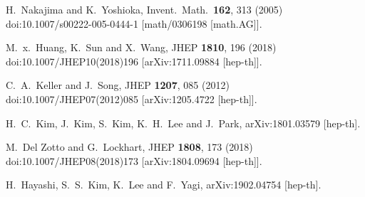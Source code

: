 \documentclass[12pt]{article}
\begin{document}
\pagebreak
\providecommand{\href}[2]{#2}\begingroup\raggedright\begin{thebibliography}{10}

  H.~Nakajima and K.~Yoshioka,
  Invent.\ Math.\  {\bf 162}, 313 (2005)
  doi:10.1007/s00222-005-0444-1
  [math/0306198 [math.AG]].

  M.~x.~Huang, K.~Sun and X.~Wang,
  JHEP {\bf 1810}, 196 (2018)
  doi:10.1007/JHEP10(2018)196
  [arXiv:1711.09884 [hep-th]].

  C.~A.~Keller and J.~Song,
  JHEP {\bf 1207}, 085 (2012)
  doi:10.1007/JHEP07(2012)085
  [arXiv:1205.4722 [hep-th]].

  H.~C.~Kim, J.~Kim, S.~Kim, K.~H.~Lee and J.~Park,
  arXiv:1801.03579 [hep-th].

  M.~Del Zotto and G.~Lockhart,
  JHEP {\bf 1808}, 173 (2018)
  doi:10.1007/JHEP08(2018)173
  [arXiv:1804.09694 [hep-th]].

  H.~Hayashi, S.~S.~Kim, K.~Lee and F.~Yagi,
  arXiv:1902.04754 [hep-th].

\end{thebibliography}\endgroup
\end{document}
